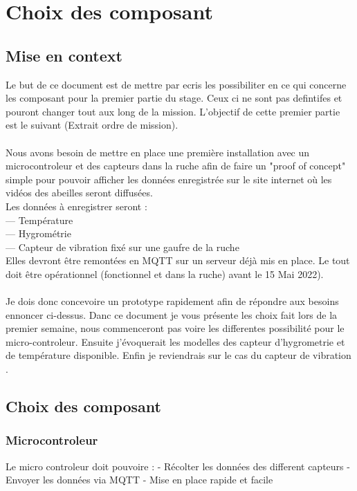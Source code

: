 \documentclass[5pt]{article}
\begin{document}
\section{Choix des composant}

\subsection{Mise en context}

Le but de ce document est de mettre par ecris les possibiliter en ce qui concerne les composant pour la premier partie du stage. Ceux ci ne sont pas defintifes et 
pouront changer tout aux long de la mission. L'objectif de cette premier partie est le suivant (Extrait ordre de mission).\\ 
\\
Nous avons besoin de mettre en place une première installation avec un microcontroleur et
des capteurs dans la ruche afin de faire un "proof of concept" simple pour pouvoir afficher les
données enregistrée sur le site internet où les vidéos des abeilles seront diffusées.\\
Les données à enregistrer seront :\\
— Température\\
— Hygrométrie\\
— Capteur de vibration fixé sur une gaufre de la ruche\\
Elles devront être remontées en MQTT sur un serveur déjà mis en place.
Le tout doit être opérationnel (fonctionnel et dans la ruche) avant le 15 Mai 2022).
\\
\\
Je dois donc concevoire un prototype rapidement afin de répondre aux besoins ennoncer ci-dessus.
Danc ce document je vous présente les choix fait lors de la premier semaine, nous commenceront pas voire les differentes
possibilité pour le micro-controleur. Ensuite j'évoquerait les modelles des capteur d'hygrometrie et de température disponible. 
Enfin je reviendrais sur le cas du capteur de vibration .

\subsection{Choix des composant}

\subsubsection{Microcontroleur}
Le micro controleur doit pouvoire :
	- Récolter les données des different capteurs
	- Envoyer les données via MQTT
	- Mise en place rapide et facile
\end{document}
